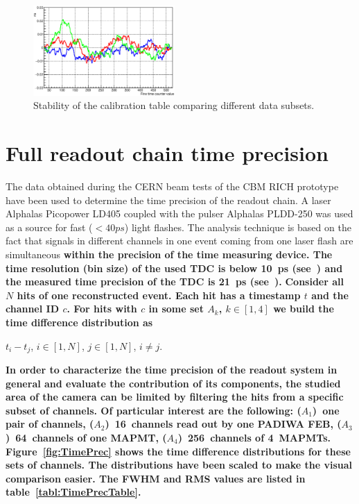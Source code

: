 \documentclass[final,5p,times,twocolumn]{elsarticle}
\begin{document}
\begin{figure}[h]
	\centering
	\includegraphics[width=0.48\textwidth]{figures/Stability_01_diff.eps}
	\caption{Stability of the calibration table comparing different data subsets.}
	\label{fig:CalibStability}
\end{figure}


\section{Full readout chain time precision}

The data obtained during the CERN beam tests of the CBM RICH prototype have been used to determine the time precision of the readout chain. A laser Alphalas Picopower LD405 coupled with the pulser Alphalas PLDD-250 \cite{LASER} was used as a source for fast ($<40ps$) light flashes. The analysis technique is based on the fact that signals in different channels in one event coming from one laser flash are simultaneous \textbf{within the precision of the time measuring device. The time resolution (bin size) of the used TDC is below 10~ps (see~\cite{TDC}) and the measured time precision of the TDC is 21~ps (see~\cite{PEPAN}).}
\textbf{Consider all $N$ hits of one reconstructed event. Each hit has a timestamp $t$ and the channel ID $c$. For hits with $c$ in some set $A_k$, $k \in [1,4]$ we build the time difference distribution as}

{\centering
$t_i-t_j$, $i \in [1,N]$, $j \in [1,N]$, $i \neq j$. \\
}

\textbf{In order to characterize the time precision of the readout system in general and evaluate the contribution of its components, the studied area of the camera can be limited by filtering the hits from a specific subset of channels. Of particular interest are the following: ($A_1$)~one pair of channels, ($A_2$)~16~channels read out by one PADIWA FEB, ($A_3$)~64~channels of one MAPMT, ($A_4$)~256~channels of 4~MAPMTs. Figure~\ref{fig:TimePrec} shows the time difference distributions for these sets of channels. The distributions have been scaled to make the visual comparison easier. The FWHM and RMS values are listed in table~\ref{tabl:TimePrecTable}.
}
\end{document}
